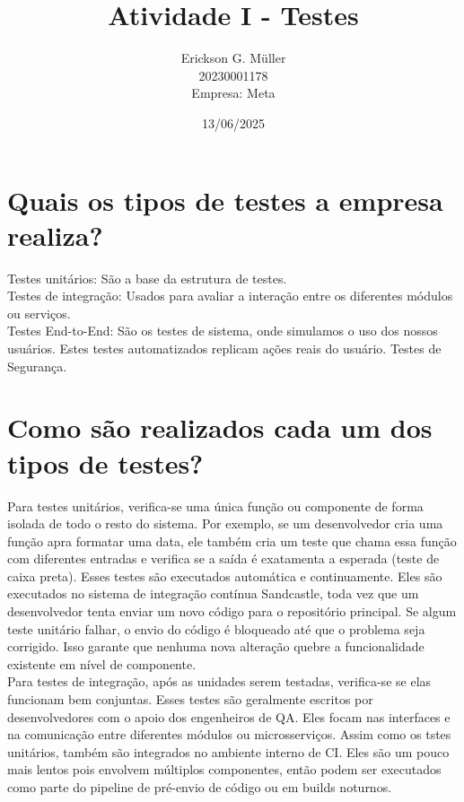\documentclass[ ]{article}
\title{Atividade I - Testes}
\author{Erickson G. Müller\\20230001178\\Empresa: Meta}
\date{13/06/2025}
\begin{document}
\maketitle
\newpage
\section{Quais os tipos de testes a empresa realiza?}
Testes unitários: São a base da estrutura de testes.\\
Testes de integração: Usados para avaliar a interação entre os diferentes módulos ou serviços.\\
Testes End-to-End: São os testes de sistema, onde simulamos o uso dos nossos usuários. Estes testes automatizados replicam ações reais do usuário. Testes de Segurança.\\

\section{Como são realizados cada um dos tipos de testes?}
Para testes unitários, verifica-se uma única função ou componente de forma isolada de todo o resto do sistema. Por exemplo, se um desenvolvedor cria uma função apra formatar uma data, ele também cria um teste que chama essa função com diferentes entradas e verifica se a saída é exatamenta a esperada (teste de caixa preta). Esses testes são executados automática e continuamente. Eles são executados no sistema de integração contínua Sandcastle, toda vez que um desenvolvedor tenta enviar um novo código para o repositório principal. Se algum teste unitário falhar, o envio do código é bloqueado até que o problema seja corrigido. Isso garante que nenhuma nova alteração quebre a funcionalidade existente em nível de componente.\\
Para testes de integração, após as unidades serem testadas, verifica-se se elas funcionam bem conjuntas. Esses testes são geralmente escritos por desenvolvedores com o apoio dos engenheiros de QA. Eles focam nas interfaces e na comunicação entre diferentes módulos ou microsserviços. Assim como os tstes unitários, também são integrados no ambiente interno de CI. Eles são um pouco mais lentos pois envolvem múltiplos componentes, então podem ser executados como parte do pipeline de pré-envio de código ou em builds noturnos.
\end{document}
